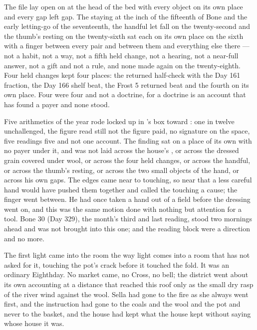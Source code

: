 The file lay open on  at the head of the bed with every object on its own place and every gap left gap. The staying at the inch of the fifteenth of Bone and the early letting-go of the seventeenth, the handful let fall on the twenty-second and the thumb's resting on the twenty-sixth sat each on its own place on the sixth with a finger between every pair and between them and everything else there — not a habit, not a way, not a fifth held change, not a hearing, not a near-full answer, not a gift and not a rule, and none made again on the twenty-eighth. Four held changes kept four places: the returned half-check with the Day 161 fraction, the Day 166 shelf beat, the Frost 5 returned beat and the fourth on its own place. Four were four and not a doctrine, for a doctrine is an account that has found a payer and none stood.

Five arithmetics of the year rode locked up  in 's box toward : one in twelve unchallenged, the figure read still not the figure paid, no signature on the space, five readings five and not one account. The finding sat on a place of its own with no payer under it, and was not laid across the house's , or across the dressed grain covered under wool, or across the four held changes, or across the handful, or across the thumb's resting, or across the two small objects of the hand, or across his own gaps. The edges came near to touching, so near that a less careful hand would have pushed them together and called the touching a cause; the finger went between. He had once taken a hand out of a field before the dressing went on, and this was the same motion done with nothing but attention for a tool. Bone 30 (Day 329), the month's third and last reading, stood two mornings ahead and was not brought into this one;  and the reading block were a direction and no more.

\scenebreak

The first light came into the room the way light comes into a room that has not asked for it, touching the pot's crack before it touched the fold. It was an ordinary Eighthday. No market came, no Cross, no bell; the district went about its own accounting at a distance that reached this roof only as the small dry rasp of the river wind against the wool. Sella had gone to the fire as she always went first, and the instruction had gone to the coals and the wool and the pot and never to the basket, and the house had kept what the house kept without saying whose house it was.

